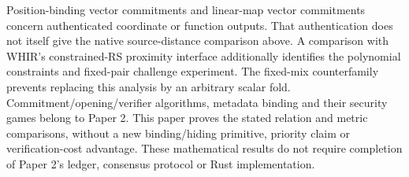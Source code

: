 Position-binding vector commitments \cite{catalanoFiore2011} and linear-map
vector commitments \cite{campanelliEtAl2022} concern authenticated coordinate
or function outputs. That authentication does not itself give the native
source-distance comparison above. A comparison with WHIR's constrained-RS
proximity interface \cite{arnonChiesaFenziYogev2024} additionally identifies
the polynomial constraints and fixed-pair challenge experiment. The fixed-mix
counterfamily prevents replacing this analysis by an arbitrary scalar fold.
Commitment/opening/verifier algorithms, metadata binding and their security
games belong to Paper 2. This paper proves the stated relation and metric
comparisons, without a new binding/hiding primitive, priority claim or
verification-cost advantage. These mathematical results do not require
completion of Paper 2's ledger, consensus protocol or Rust implementation.
